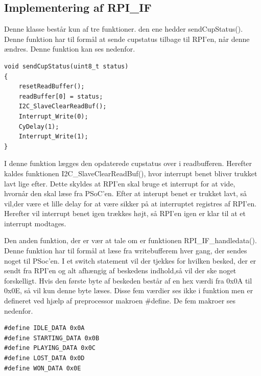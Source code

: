 \documentclass[Softwaredesign/Softwaredesign_main.tex]{subfiles}
\begin{document}
\subsection{Implementering af RPI\_IF}\label{sec:RPI_IF_implementering_bilag}
Denne klasse består kun af tre funktioner. den ene hedder sendCupStatus(). Denne funktion har til formål at sende cupstatus tilbage til RPI'en, når denne ændres. Denne funktion kan ses nedenfor.
\begin{lstlisting}
void sendCupStatus(uint8_t status)
{
    resetReadBuffer();
    readBuffer[0] = status;
    I2C_SlaveClearReadBuf();
    Interrupt_Write(0);
    CyDelay(1);
    Interrupt_Write(1);
}
\end{lstlisting}
I denne funktion lægges den opdaterede cupstatus over i readbufferen. Herefter kaldes funktionen I2C\_SlaveClearReadBuf(), hvor interrupt benet bliver trukket lavt lige efter. Dette skyldes at RPI'en skal bruge et interrupt for at vide, hvornår den skal læse fra PSoC'en. Efter at interupt benet er trukket lavt, så vil,der være et lille delay for at være sikker på at interruptet registres af RPI'en. Herefter vil interrupt benet igen trækkes højt, så RPI'en igen er klar til at et interrupt modtages. 

Den anden funktion, der er vær at tale om er funktionen RPI\_IF\_handledata(). Denne funktion har til formål at læse fra writebufferem hver gang, der sendes noget til PSoc'en. I et switch statement vil der tjekkes for hvilken besked, der er sendt fra RPI'en og alt afhængig af beskedens indhold,så vil der ske noget forskelligt. Hvis den første byte af beskeden består af en hex værdi fra 0x0A til 0x0E, så vil kun denne byte læses. Disse fem værdier ses ikke i funktion men er defineret ved hjælp af preprocessor makroen \#define. De fem makroer ses nedenfor.
\begin{lstlisting}
#define IDLE_DATA 0x0A
#define STARTING_DATA 0x0B
#define PLAYING_DATA 0x0C
#define LOST_DATA 0x0D
#define WON_DATA 0x0E
\end{lstlisting}
\end{document}
